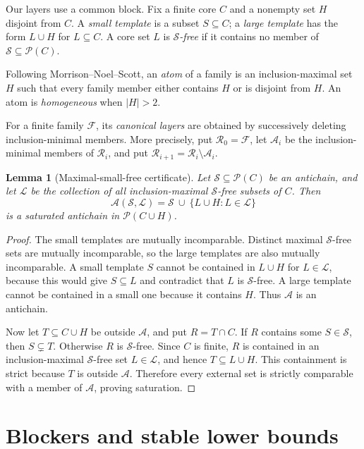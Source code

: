 \documentclass[a4paper,fleqn,longmktitle]{cas-sc}
\newtheorem{lemma}[theorem]{Lemma}
\theoremstyle{definition}
\theoremstyle{remark}
\newcommand{\powerset}{\mathcal{P}}
\newcommand{\family}{\mathcal{F}}
\newcommand{\smallcores}{\mathcal{S}}
\newcommand{\largecores}{\mathcal{L}}
\begin{document}
Our layers use a common block.  Fix a finite core $C$ and a nonempty set $H$
disjoint from $C$.  A \emph{small template} is a subset $S\subseteq C$; a
\emph{large template} has the form $L\cup H$ for $L\subseteq C$.  A core set
$L$ is \emph{$\smallcores$-free} if it contains no member of
$\smallcores\subseteq\powerset(C)$.

Following Morrison--Noel--Scott, an \emph{atom} of a family is an
inclusion-maximal set $H$ such that every family member either contains $H$
or is disjoint from $H$.  An atom is \emph{homogeneous} when $|H|>2$.

For a finite family $\family$, its \emph{canonical layers} are obtained by
successively deleting inclusion-minimal members.  More precisely, put
$\mathcal R_0=\family$, let $\mathcal A_i$ be the inclusion-minimal members
of $\mathcal R_i$, and put
$\mathcal R_{i+1}=\mathcal R_i\setminus\mathcal A_i$.

\begin{lemma}[Maximal-small-free certificate]
\label{lem:maximal-free}
Let $\smallcores\subseteq\powerset(C)$ be an antichain, and let
$\largecores$ be the collection of all inclusion-maximal
$\smallcores$-free subsets of $C$.  Then
\[
  \mathcal A(\smallcores,\largecores)
  =\smallcores\ \cup\ \{L\cup H:L\in\largecores\}
\]
is a saturated antichain in $\powerset(C\cup H)$.
\end{lemma}

\begin{proof}
The small templates are mutually incomparable.  Distinct maximal
$\smallcores$-free sets are mutually incomparable, so the large templates are
also mutually incomparable.  A small template $S$ cannot be contained in
$L\cup H$ for $L\in\largecores$, because this would give $S\subseteq L$ and
contradict that $L$ is $\smallcores$-free.  A large template cannot be
contained in a small one because it contains $H$.  Thus $\mathcal A$ is an
antichain.

Now let $T\subseteq C\cup H$ be outside $\mathcal A$, and put $R=T\cap C$.
If $R$ contains some $S\in\smallcores$, then $S\subsetneq T$.  Otherwise $R$
is $\smallcores$-free.  Since $C$ is finite, $R$ is contained in an
inclusion-maximal $\smallcores$-free set $L\in\largecores$, and hence
$T\subseteq L\cup H$.  This containment is strict because $T$ is outside
$\mathcal A$.  Therefore every external set is strictly comparable with a
member of $\mathcal A$, proving saturation.
\end{proof}

\section{Blockers and stable lower bounds}
\label{sec:blockers}
\end{document}
